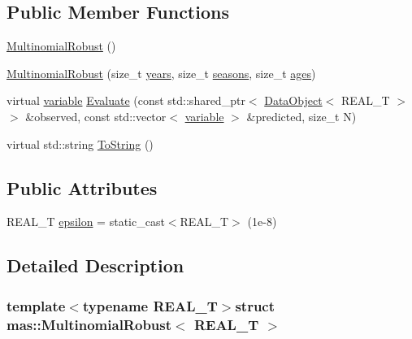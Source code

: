 \subsection*{Public Member Functions}
\begin{DoxyCompactItemize}
\item 
\hyperlink{structmas_1_1_multinomial_robust_a2e5610844b137bb244feb772c28329be}{Multinomial\-Robust} ()
\item 
\hyperlink{structmas_1_1_multinomial_robust_a446394824c179ca70723c1c5fb525f8e}{Multinomial\-Robust} (size\-\_\-t \hyperlink{structmas_1_1_n_l_l_functor_ac76e5d7e0808486b42ffdaea952dd19f}{years}, size\-\_\-t \hyperlink{structmas_1_1_n_l_l_functor_ac59c36239b1817b5bb357bf90dc4802d}{seasons}, size\-\_\-t \hyperlink{structmas_1_1_n_l_l_functor_aa70e461c812bff95770cda5dbb79b6b9}{ages})
\item 
virtual \hyperlink{structmas_1_1_model_object_a4e62fdbb5826f8fac311262b888ab10a}{variable} \hyperlink{structmas_1_1_multinomial_robust_a7c6e6e6fa0e96e92c3194a1c18b8745e}{Evaluate} (const std\-::shared\-\_\-ptr$<$ \hyperlink{structmas_1_1_data_object}{Data\-Object}$<$ R\-E\-A\-L\-\_\-\-T $>$ $>$ \&observed, const std\-::vector$<$ \hyperlink{structmas_1_1_model_object_a4e62fdbb5826f8fac311262b888ab10a}{variable} $>$ \&predicted, size\-\_\-t N)
\item 
virtual std\-::string \hyperlink{structmas_1_1_multinomial_robust_a57b1509abe3c1640fb0e24f636fbbd87}{To\-String} ()
\end{DoxyCompactItemize}
\subsection*{Public Attributes}
\begin{DoxyCompactItemize}
\item 
R\-E\-A\-L\-\_\-\-T \hyperlink{structmas_1_1_multinomial_robust_a7ef9fbeaf2f295d919b770a09b7f33b4}{epsilon} = static\-\_\-cast$<$R\-E\-A\-L\-\_\-\-T$>$ (1e-\/8)
\end{DoxyCompactItemize}


\subsection{Detailed Description}
\subsubsection*{template$<$typename R\-E\-A\-L\-\_\-\-T$>$struct mas\-::\-Multinomial\-Robust$<$ R\-E\-A\-L\-\_\-\-T $>$}



